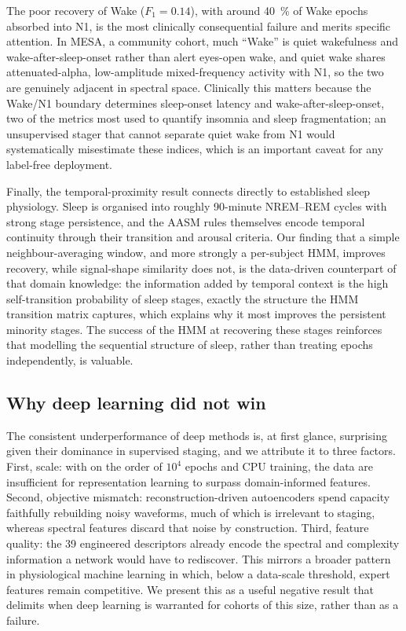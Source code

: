 \documentclass[11pt,a4paper]{article}
\begin{document}
The poor recovery of Wake ($F_1=0.14$), with around \SI{40}{\percent} of Wake
epochs absorbed into N1, is the most clinically consequential failure and merits
specific attention. In MESA, a community cohort, much ``Wake'' is quiet wakefulness
and wake-after-sleep-onset rather than alert eyes-open wake, and quiet wake shares
attenuated-alpha, low-amplitude mixed-frequency activity with N1, so the two are
genuinely adjacent in spectral space. Clinically this matters because the Wake/N1
boundary determines sleep-onset latency and wake-after-sleep-onset, two of the
metrics most used to quantify insomnia and sleep fragmentation; an unsupervised
stager that cannot separate quiet wake from N1 would systematically misestimate
these indices, which is an important caveat for any label-free deployment.

Finally, the temporal-proximity result connects directly to established sleep
physiology. Sleep is organised into roughly 90-minute NREM--REM cycles with strong
stage persistence, and the AASM rules themselves encode temporal continuity through
their transition and arousal criteria. Our finding that a simple neighbour-averaging
window, and more strongly a per-subject HMM, improves recovery, while signal-shape
similarity does not, is the data-driven counterpart of that domain knowledge: the
information added by temporal context is the high self-transition probability of
sleep stages, exactly the structure the HMM transition matrix captures, which
explains why it most improves the persistent minority stages. The success of the
HMM at recovering these stages reinforces that modelling the sequential structure of
sleep, rather than treating epochs independently, is valuable.

\subsection{Why deep learning did not win}
The consistent underperformance of deep methods is, at first glance, surprising
given their dominance in supervised staging, and we attribute it to three factors.
First, scale: with on the order of $10^4$ epochs and CPU training, the data are
insufficient for representation learning to surpass domain-informed features.
Second, objective mismatch: reconstruction-driven autoencoders spend capacity
faithfully rebuilding noisy waveforms, much of which is irrelevant to staging,
whereas spectral features discard that noise by construction. Third, feature
quality: the 39 engineered descriptors already encode the spectral and complexity
information a network would have to rediscover. This mirrors a broader pattern in
physiological machine learning in which, below a data-scale threshold, expert
features remain competitive. We present this as a useful negative result that
delimits when deep learning is warranted for cohorts of this size, rather than as a
failure.
\end{document}
